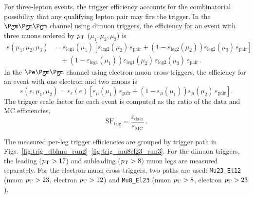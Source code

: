For three-lepton events, the trigger efficiency accounts for the combinatorial possibility that any qualifying lepton pair may fire the trigger. In the $\Pgm\Pgm\Pgm$ channel using dimuon triggers, the efficiency for an event with three muons ordered by $p_{\mathrm{T}}$ ($\mu_1, \mu_2, \mu_3$) is
\begin{align}
\label{eq:trig_3mu}
\varepsilon(\mu_1, \mu_2, \mu_3) &= \varepsilon_\text{leg1}(\mu_1) \left[ \varepsilon_\text{leg2}(\mu_2)\,\varepsilon_\text{pair} + \left(1 - \varepsilon_\text{leg2}(\mu_2)\right) \varepsilon_\text{leg2}(\mu_3)\,\varepsilon_\text{pair} \right] \nonumber \\
&\quad + \left(1 - \varepsilon_\text{leg1}(\mu_1)\right) \varepsilon_\text{leg1}(\mu_2)\,\varepsilon_\text{leg2}(\mu_3)\,\varepsilon_\text{pair}\,.
\end{align}
In the $\Pe\Pgm\Pgm$ channel using electron-muon cross-triggers, the efficiency for an event with one electron and two muons is
\begin{equation}
\label{eq:trig_emu}
\varepsilon(e, \mu_1, \mu_2) = \varepsilon_e(e) \left[ \varepsilon_\mu(\mu_1)\,\varepsilon_\text{pair} + \left(1 - \varepsilon_\mu(\mu_1)\right) \varepsilon_\mu(\mu_2)\,\varepsilon_\text{pair} \right] .
\end{equation}
The trigger scale factor for each event is computed as the ratio of the data and MC efficiencies,
\begin{equation}
\text{SF}_\text{trig} = \frac{\varepsilon_\text{data}}{\varepsilon_\text{MC}}\,.
\end{equation}

The measured per-leg trigger efficiencies are grouped by trigger path in Figs.~\ref{fig:trig_dblmu_run2}--\ref{fig:trig_mu8el23_run3}. For the dimuon triggers, the leading ($p_{\mathrm{T}} > 17$\GeV) and subleading ($p_{\mathrm{T}} > 8$\GeV) muon legs are measured separately. For the electron-muon cross-triggers, two paths are used: \texttt{Mu23\_El12} (muon $p_{\mathrm{T}} > 23$\GeV, electron $p_{\mathrm{T}} > 12$\GeV) and \texttt{Mu8\_El23} (muon $p_{\mathrm{T}} > 8$\GeV, electron $p_{\mathrm{T}} > 23$\GeV).

